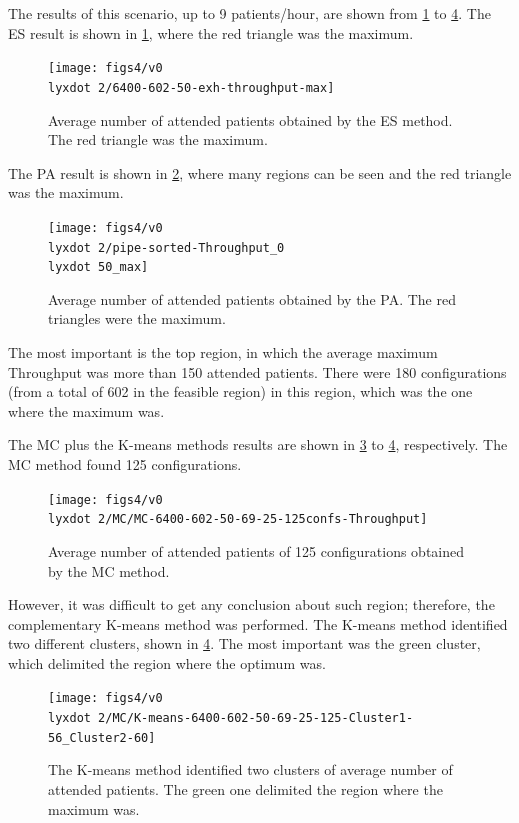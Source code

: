 The results of this scenario, up to 9 patients/hour, are shown from
\ref{subfig:es8-2} to \ref{subfig:km8-2}. The ES result is shown
in \ref{subfig:es8-2}, where the red triangle was the maximum. 
\begin{figure}[H]
\centering{}\texttt{[image: figs4/v0\\lyxdot 2/6400-602-50-exh-throughput-max]}\caption{Average number of attended patients obtained by the ES method. The
red triangle was the maximum.\label{subfig:es8-2}}
\end{figure}


The PA result is shown in \ref{subfig:pipe8-2}, where many regions
can be seen and the red triangle was the maximum. 
\begin{figure}[H]
\centering{}\texttt{[image: figs4/v0\\lyxdot 2/pipe-sorted-Throughput\_0\\lyxdot 50\_max]}\caption{Average number of attended patients obtained by the PA. The red triangles
were the maximum.\label{subfig:pipe8-2}}
\end{figure}
 The most important is the top region, in which the average maximum
Throughput was more than 150 attended patients. There were 180 configurations
(from a total of 602 in the feasible region) in this region, which
was the one where the maximum was.

The MC plus the K-means methods results are shown in \ref{subfig:mc8-2}
to \ref{subfig:km8-2}, respectively. The MC method found 125 configurations.
\begin{figure}[H]
\centering{}\texttt{[image: figs4/v0\\lyxdot 2/MC/MC-6400-602-50-69-25-125confs-Throughput]}\caption{Average number of attended patients of 125 configurations obtained
by the MC method. \label{subfig:mc8-2}}
\end{figure}
 However, it was difficult to get any conclusion about such region;
therefore, the complementary K-means method was performed. The K-means
method identified two different clusters, shown in \ref{subfig:km8-2}.
The most important was the green cluster, which delimited the region
where the optimum was.
\begin{figure}[H]
\begin{centering}
\texttt{[image: figs4/v0\\lyxdot 2/MC/K-means-6400-602-50-69-25-125-Cluster1-56\_Cluster2-60]}
\par\end{centering}

\caption{The K-means method identified two clusters of average number of attended
patients. The green one delimited the region where the maximum was.\label{subfig:km8-2}}
\end{figure}


